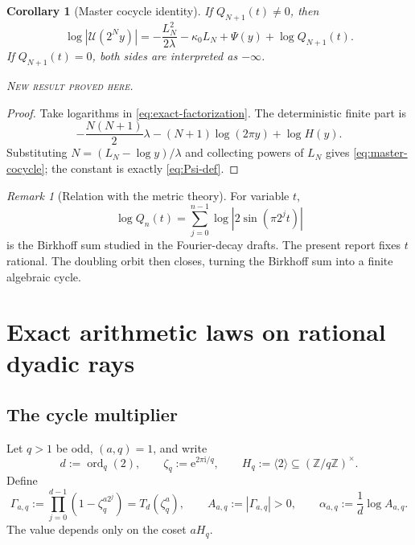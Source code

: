 \documentclass[11pt,oneside]{article}
\newtheorem{corollary}[theorem]{Corollary}
\theoremstyle{definition}
\theoremstyle{remark}
\newtheorem{remark}[theorem]{Remark}
\newcommand{\Z}{\mathbb Z}
\newcommand{\ord}{\operatorname{ord}}
\newcommand{\e}{\mathrm e}
\newcommand{\ii}{\mathrm i}
\newcommand{\newresult}{\textcolor{newgreen}{\textsc{New result proved here.}}}
\begin{document}
\begin{corollary}[Master cocycle identity]\label{cor:master-cocycle}
If $Q_{N+1}(t)\ne0$, then
\begin{equation}
 \boxed{
 \log|\mathscr U(2^Ny)|
 =-\frac{L_N^2}{2\lambda}-\kappa_0L_N
 +\Psi(y)+\log Q_{N+1}(t).}
 \label{eq:master-cocycle}
\end{equation}
If $Q_{N+1}(t)=0$, both sides are interpreted as $-\infty$.

\smallskip\noindent\newresult
\end{corollary}

\begin{proof}
Take logarithms in \eqref{eq:exact-factorization}. The deterministic finite part is
\[
 -\frac{N(N+1)}2\lambda-(N+1)\log(2\pi y)+\log H(y).
\]
Substituting $N=(L_N-\log y)/\lambda$ and collecting powers of $L_N$ gives
\eqref{eq:master-cocycle}; the constant is exactly \eqref{eq:Psi-def}.
\end{proof}

\begin{remark}[Relation with the metric theory]
For variable $t$,
\[
 \log Q_n(t)=\sum_{j=0}^{n-1}\log|2\sin(\pi2^jt)|
\]
is the Birkhoff sum studied in the Fourier-decay drafts. The present report fixes
$t$ rational. The doubling orbit then closes, turning the Birkhoff sum into a
finite algebraic cycle.
\end{remark}

\section{Exact arithmetic laws on rational dyadic rays}\label{sec:rational-rays}

\subsection{The cycle multiplier}

Let $q>1$ be odd, $(a,q)=1$, and write
\begin{equation}
 d:=\ord_q(2),\qquad
 \zeta_q:=\e^{2\pi\ii/q},\qquad
 H_q:=\langle2\rangle\subseteq(\Z/q\Z)^\times.
 \label{eq:q-d-H}
\end{equation}
Define
\begin{equation}
 \Gamma_{a,q}:=\prod_{j=0}^{d-1}(1-\zeta_q^{a2^j})=T_d(\zeta_q^a),
 \qquad A_{a,q}:=|\Gamma_{a,q}|>0,
 \qquad \alpha_{a,q}:=\frac1d\log A_{a,q}.
 \label{eq:Gamma-A-alpha}
\end{equation}
The value depends only on the coset $aH_q$.
\end{document}
